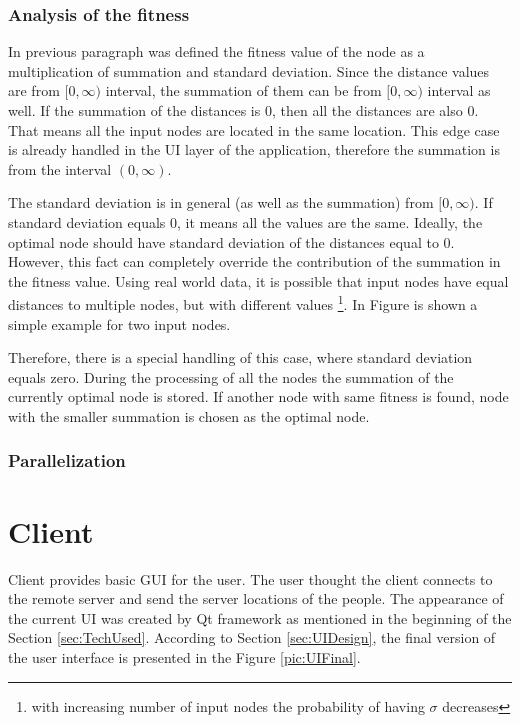\documentclass[thesis=M,english]{FITthesis}[2012/10/20]
\begin{document}
\subsubsection{Analysis of the fitness}
In previous paragraph was defined the fitness value of the node as a multiplication of summation and standard deviation. Since the distance values are from $[0, \infty)$ interval, the summation of them can be from $[0, \infty)$ interval as well. If the summation of the distances is $0$, then all the distances are also $0$. That means all the input nodes are located in the same location. This edge case is already handled in the UI layer of the application, therefore the summation is from the interval $(0, \infty)$.

The standard deviation is in general (as well as the summation) from $[0, \infty)$. If standard deviation equals $0$, it means all the values are the same. Ideally, the optimal node should have standard deviation of the distances equal to $0$. However, this fact can completely override the contribution of the summation in the fitness value. Using real world data, it is possible that input nodes have equal distances to multiple nodes, but with different values \footnote{with increasing number of input nodes the probability of having $\sigma$ decreases}. In Figure is shown a simple example for two input nodes.

Therefore, there is a special handling of this case, where standard deviation equals zero. During the processing of all the nodes the summation of the currently optimal node is stored. If another node with same fitness is found, node with the smaller summation is chosen as the optimal node.


\subsubsection{Parallelization}

\section{Client}
\label{sec:RClient}
Client provides basic GUI for the user. The user thought the client connects to the remote server and send the server locations of the people.
The appearance of the current UI was created by Qt framework as mentioned in the beginning of the Section \ref{sec:TechUsed}. According to Section \ref{sec:UIDesign}, the final version of the user interface is presented in the Figure \ref{pic:UIFinal}.
\end{document}
